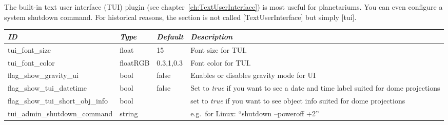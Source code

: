 \section{}\label{sec:config.ini:tui}

The built-in text user interface (TUI) plugin (see chapter~\ref{ch:TextUserInterface}) is most useful for planetariums. You can even configure a system shutdown command. 
For historical reasons, the section is not called [TextUserInterface] but simply [tui].

\begin{longtabu} to \textwidth {l|l|l|X}\toprule
\emph{ID} & \emph{Type} &\emph{Default}& \emph{Description}\\\midrule
tui\_font\_size           &float    &15       &Font size for TUI.\\\midrule
tui\_font\_color          &floatRGB &0.3,1,0.3&Font color for TUI.\\\midrule
flag\_show\_gravity\_ui   & bool    &false    & Enables or disables gravity mode for UI\\\midrule
flag\_show\_tui\_datetime & bool    &false    &Set to \emph{true} if you want to see a date and time label suited for dome projections\\\midrule
flag\_show\_tui\_short\_obj\_info   & bool&    &set to \emph{true} if you want to see object info suited for dome projections\\\midrule
tui\_admin\_shutdown\_command       & string  && e.g.\ for Linux: ``shutdown --poweroff +2'' \\\bottomrule
\end{longtabu}

\section{}\label{sec:config.ini:video}

